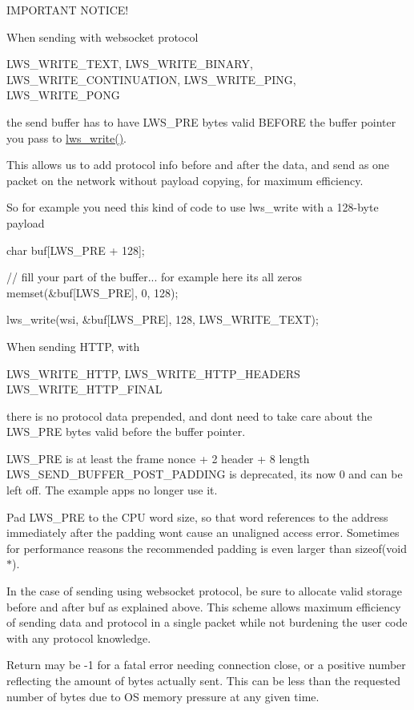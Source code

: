 I\+M\+P\+O\+R\+T\+A\+NT N\+O\+T\+I\+C\+E!

When sending with websocket protocol

L\+W\+S\+\_\+\+W\+R\+I\+T\+E\+\_\+\+T\+E\+XT, L\+W\+S\+\_\+\+W\+R\+I\+T\+E\+\_\+\+B\+I\+N\+A\+RY, L\+W\+S\+\_\+\+W\+R\+I\+T\+E\+\_\+\+C\+O\+N\+T\+I\+N\+U\+A\+T\+I\+ON, L\+W\+S\+\_\+\+W\+R\+I\+T\+E\+\_\+\+P\+I\+NG, L\+W\+S\+\_\+\+W\+R\+I\+T\+E\+\_\+\+P\+O\+NG

the send buffer has to have L\+W\+S\+\_\+\+P\+RE bytes valid B\+E\+F\+O\+RE the buffer pointer you pass to \hyperlink{group__sending-data_gafd5fdd285a0e25ba7e3e1051deec1001}{lws\+\_\+write()}.

This allows us to add protocol info before and after the data, and send as one packet on the network without payload copying, for maximum efficiency.

So for example you need this kind of code to use lws\+\_\+write with a 128-\/byte payload

char buf\mbox{[}L\+W\+S\+\_\+\+P\+RE + 128\mbox{]};

// fill your part of the buffer... for example here it\textquotesingle{}s all zeros memset(\&buf\mbox{[}\+L\+W\+S\+\_\+\+P\+R\+E\mbox{]}, 0, 128);

lws\+\_\+write(wsi, \&buf\mbox{[}\+L\+W\+S\+\_\+\+P\+R\+E\mbox{]}, 128, L\+W\+S\+\_\+\+W\+R\+I\+T\+E\+\_\+\+T\+E\+X\+T);

When sending H\+T\+TP, with

L\+W\+S\+\_\+\+W\+R\+I\+T\+E\+\_\+\+H\+T\+TP, L\+W\+S\+\_\+\+W\+R\+I\+T\+E\+\_\+\+H\+T\+T\+P\+\_\+\+H\+E\+A\+D\+E\+RS L\+W\+S\+\_\+\+W\+R\+I\+T\+E\+\_\+\+H\+T\+T\+P\+\_\+\+F\+I\+N\+AL

there is no protocol data prepended, and don\textquotesingle{}t need to take care about the L\+W\+S\+\_\+\+P\+RE bytes valid before the buffer pointer.

L\+W\+S\+\_\+\+P\+RE is at least the frame nonce + 2 header + 8 length L\+W\+S\+\_\+\+S\+E\+N\+D\+\_\+\+B\+U\+F\+F\+E\+R\+\_\+\+P\+O\+S\+T\+\_\+\+P\+A\+D\+D\+I\+NG is deprecated, it\textquotesingle{}s now 0 and can be left off. The example apps no longer use it.

Pad L\+W\+S\+\_\+\+P\+RE to the C\+PU word size, so that word references to the address immediately after the padding won\textquotesingle{}t cause an unaligned access error. Sometimes for performance reasons the recommended padding is even larger than sizeof(void $\ast$). \begin{DoxyVerb} In the case of sending using websocket protocol, be sure to allocate
 valid storage before and after buf as explained above.  This scheme
 allows maximum efficiency of sending data and protocol in a single
 packet while not burdening the user code with any protocol knowledge.

 Return may be -1 for a fatal error needing connection close, or a
 positive number reflecting the amount of bytes actually sent.  This
 can be less than the requested number of bytes due to OS memory
 pressure at any given time.\end{DoxyVerb}
 